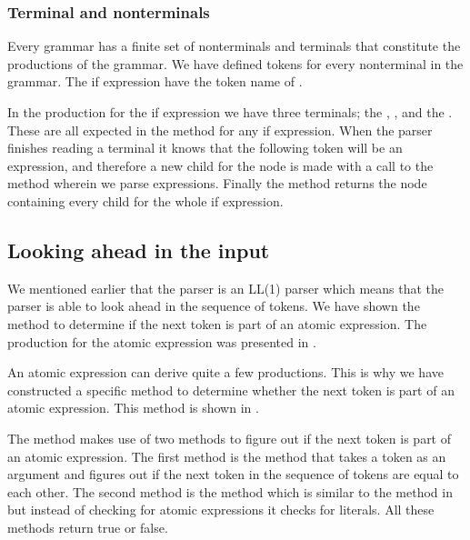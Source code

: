 \subsubsection{Terminal and nonterminals}
Every grammar has a finite set of nonterminals and terminals that constitute the
productions of the grammar. We have defined tokens for every nonterminal in the
grammar. The if expression have the token name of .

In the production for the if expression we have three terminals; the ,
, and the . These are all expected in the method for any
if expression. When the parser finishes reading a terminal it knows that the
following token will be an expression, and therefore a new child for the node is
made with a call to the  method wherein we parse
expressions. Finally the method returns the node containing every child for the
whole if expression.

\subsection{Looking ahead in the input}
We mentioned earlier that the parser is an LL(1) parser which means that the
parser is able to look ahead in the sequence of tokens. We have shown the
 method to determine if the next token is part of an
atomic expression. The production for the atomic expression was presented in
.


An atomic expression can derive quite a few productions. This is why we have
constructed a specific method to determine whether the next token is part of an
atomic expression. This method is shown in .



The method  makes use of two methods to figure out if
the next token is part of an atomic expression. The first method is the
 method that takes a token as an argument and figures out
if the next token in the sequence of tokens are equal to each other. The second
method is the  method which is similar to the method 
in  but instead of checking for atomic expressions it 
checks for literals. All these methods return true or false.

